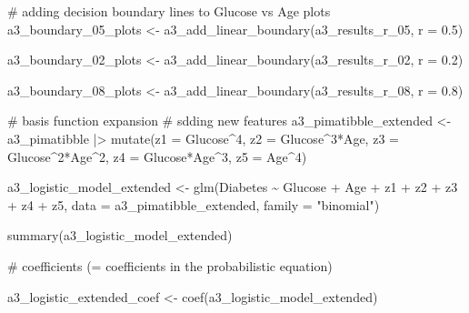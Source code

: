 \documentclass[
  english,
  11pt,
]{article}
\newenvironment{Shaded}{\begin{snugshade}}{\end{snugshade}}
\newcommand{\AttributeTok}[1]{\textcolor[rgb]{0.40,0.45,0.13}{#1}}
\newcommand{\CommentTok}[1]{\textcolor[rgb]{0.37,0.37,0.37}{#1}}
\newcommand{\DecValTok}[1]{\textcolor[rgb]{0.68,0.00,0.00}{#1}}
\newcommand{\FloatTok}[1]{\textcolor[rgb]{0.68,0.00,0.00}{#1}}
\newcommand{\FunctionTok}[1]{\textcolor[rgb]{0.28,0.35,0.67}{#1}}
\newcommand{\NormalTok}[1]{\textcolor[rgb]{0.00,0.23,0.31}{#1}}
\newcommand{\OtherTok}[1]{\textcolor[rgb]{0.00,0.23,0.31}{#1}}
\newcommand{\SpecialCharTok}[1]{\textcolor[rgb]{0.37,0.37,0.37}{#1}}
\newcommand{\StringTok}[1]{\textcolor[rgb]{0.13,0.47,0.30}{#1}}
\begin{document}
\begin{Shaded}
\begin{Highlighting}[]
\CommentTok{\# adding decision boundary lines to Glucose vs Age plots}
\NormalTok{a3\_boundary\_05\_plots }\OtherTok{\textless{}{-}}
  \FunctionTok{a3\_add\_linear\_boundary}\NormalTok{(a3\_results\_r\_05, }\AttributeTok{r =} \FloatTok{0.5}\NormalTok{)}

\NormalTok{a3\_boundary\_02\_plots }\OtherTok{\textless{}{-}}
  \FunctionTok{a3\_add\_linear\_boundary}\NormalTok{(a3\_results\_r\_02, }\AttributeTok{r =} \FloatTok{0.2}\NormalTok{)}

\NormalTok{a3\_boundary\_08\_plots }\OtherTok{\textless{}{-}}
  \FunctionTok{a3\_add\_linear\_boundary}\NormalTok{(a3\_results\_r\_08, }\AttributeTok{r =} \FloatTok{0.8}\NormalTok{)}

\CommentTok{\# basis function expansion}
\CommentTok{\# sdding new features}
\NormalTok{a3\_pimatibble\_extended }\OtherTok{\textless{}{-}}
\NormalTok{  a3\_pimatibble }\SpecialCharTok{|\textgreater{}}
  \FunctionTok{mutate}\NormalTok{(}\AttributeTok{z1 =}\NormalTok{ Glucose}\SpecialCharTok{\^{}}\DecValTok{4}\NormalTok{,}
         \AttributeTok{z2 =}\NormalTok{ Glucose}\SpecialCharTok{\^{}}\DecValTok{3}\SpecialCharTok{*}\NormalTok{Age,}
         \AttributeTok{z3 =}\NormalTok{ Glucose}\SpecialCharTok{\^{}}\DecValTok{2}\SpecialCharTok{*}\NormalTok{Age}\SpecialCharTok{\^{}}\DecValTok{2}\NormalTok{,}
         \AttributeTok{z4 =}\NormalTok{ Glucose}\SpecialCharTok{*}\NormalTok{Age}\SpecialCharTok{\^{}}\DecValTok{3}\NormalTok{,}
         \AttributeTok{z5 =}\NormalTok{ Age}\SpecialCharTok{\^{}}\DecValTok{4}\NormalTok{)}

\NormalTok{a3\_logistic\_model\_extended }\OtherTok{\textless{}{-}}
  \FunctionTok{glm}\NormalTok{(Diabetes }\SpecialCharTok{\textasciitilde{}}\NormalTok{ Glucose }\SpecialCharTok{+}\NormalTok{ Age }\SpecialCharTok{+}\NormalTok{ z1 }\SpecialCharTok{+}\NormalTok{ z2 }\SpecialCharTok{+}\NormalTok{ z3 }\SpecialCharTok{+}\NormalTok{ z4 }\SpecialCharTok{+}\NormalTok{ z5,}
      \AttributeTok{data =}\NormalTok{ a3\_pimatibble\_extended, }\AttributeTok{family =} \StringTok{"binomial"}\NormalTok{)}

\FunctionTok{summary}\NormalTok{(a3\_logistic\_model\_extended)}

\CommentTok{\# coefficients (= coefficients in the probabilistic equation)}

\NormalTok{a3\_logistic\_extended\_coef }\OtherTok{\textless{}{-}} \FunctionTok{coef}\NormalTok{(a3\_logistic\_model\_extended)}


\end{Highlighting}
\end{Shaded}
\end{document}
